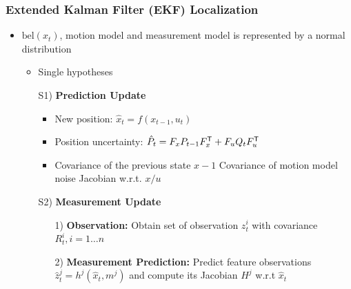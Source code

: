 \subsubsection{Extended Kalman Filter (EKF) Localization}
\begin{itemize}
    \item $\text{bel}(x_t)$, motion model and measurement model is represented by a normal distribution
        \begin{itemize}
            \item Single hypotheses
        \end{itemize}
        \begin{itemize}
            \item[S1)] \textbf{Prediction Update}
                \begin{itemize}
                    \item New position: $\hat x_t = f(x_{t-1}, u_t)$
                    \item Position uncertainty: $\hat P_t = F_x P_{t-1} F_x^{\mathsf{T}} + F_u Q_t F_u^{\mathsf{T}}$
                    \item
                        \begin{itemize}
                             Covariance of the previous state $x - 1$
                             Covariance of motion model noise
                             Jacobian w.r.t. $x/u$
                        \end{itemize}
                \end{itemize}
            \item[S2)] \textbf{Measurement Update}
                \begin{itemize}
                    \item[1)] \textbf{Observation:} Obtain set of observation $z_t^i$ with covariance $R_t^i, i=1 \dots n$
                    \item[2)] \textbf{Measurement Prediction:} Predict feature observations $\hat z_t^j = h^j(\hat x_t, m^j)$ and compute its Jacobian $H^j$ w.r.t $\hat x_t$


\end{itemize}
\end{itemize}
\end{itemize}
